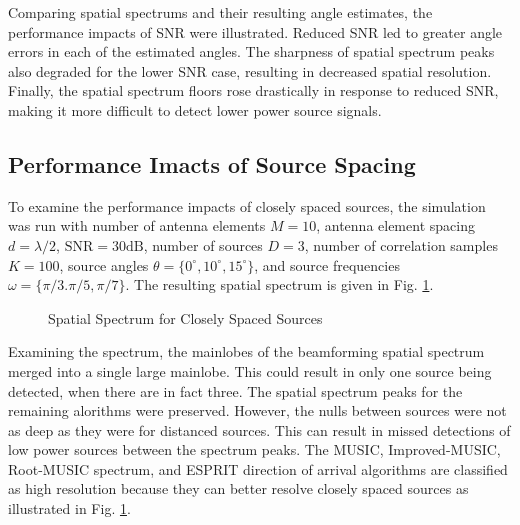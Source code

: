 \documentclass[conference]{IEEEtran}
\begin{document}
		Comparing spatial spectrums and their resulting angle estimates, the performance impacts of SNR were illustrated. Reduced SNR led to greater angle errors in each of the estimated angles. The sharpness of spatial spectrum peaks also degraded for the lower SNR case, resulting in decreased spatial resolution. Finally, the spatial spectrum floors rose drastically in response to reduced SNR, making it more difficult to detect lower power source signals.
		
		\subsection{Performance Imacts of Source Spacing}
		
		To examine the performance impacts of closely spaced sources, the simulation was run with number of antenna elements $M=10$, antenna element spacing $d=\lambda/2$, $\text{SNR}=30\text{dB}$, number of sources $D=3$, number of correlation samples $K=100$, source angles $\theta = \{0^{\circ}, 10^{\circ}, 15^{\circ}\}$, and source frequencies $\omega = \{\pi/3. \pi/5, \pi/7\}$. The resulting spatial spectrum is given in Fig. \ref{fig::closely_spaced_sources}.
		
		\begin{figure}
			\centerline{}
			\caption{Spatial Spectrum for Closely Spaced Sources}
			\label{fig::closely_spaced_sources}
		\end{figure}
		
		Examining the spectrum, the mainlobes of the beamforming spatial spectrum merged into a single large mainlobe. This could result in only one source being detected, when there are in fact three. The spatial spectrum peaks for the remaining alorithms were preserved. However, the nulls between sources were not as deep as they were for distanced sources. This can result in missed detections of low power sources between the spectrum peaks. The MUSIC, Improved-MUSIC, Root-MUSIC spectrum, and ESPRIT direction of arrival algorithms are classified as high resolution because they can better resolve closely spaced sources as illustrated in Fig. \ref{fig::closely_spaced_sources}.
		
\end{document}
